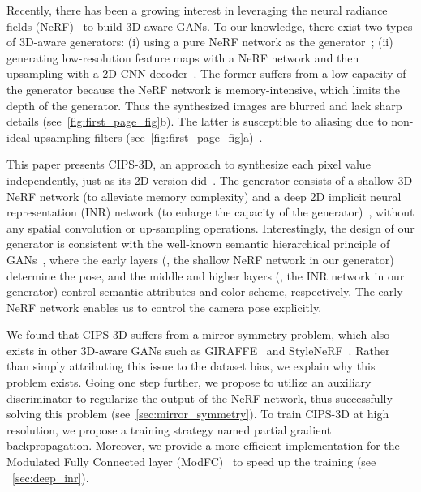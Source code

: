\documentclass[10pt,twocolumn,letterpaper]{article}
\begin{document}
Recently, there has been a growing interest in leveraging the neural radiance fields (NeRF)~\cite{mildenhall2020NeRF} to build 3D-aware GANs. To our knowledge, there exist two types of 3D-aware generators: (i) using a pure NeRF network as the generator~\cite{schwarz2020GRAF,chan2021piGAN}; (ii) generating low-resolution feature maps with a NeRF network and then upsampling with a 2D CNN decoder~\cite{niemeyer2021GIRAFFE,anonymous2021StyleNeRF}. The former suffers from a low capacity of the generator because the NeRF network is memory-intensive, which limits the depth of the generator. Thus the synthesized images are blurred and lack sharp details (see~\cref{fig:first_page_fig}b). The latter is susceptible to aliasing due to non-ideal upsampling filters (see~\cref{fig:first_page_fig}a)~\cite{karras2021AliasFree,parmar2021Buggy}.

This paper presents CIPS-3D, an approach to synthesize each pixel value independently, just as its 2D version did~\cite{anokhin2021Image}. The  generator consists of a shallow 3D NeRF network (to alleviate memory complexity) and a deep 2D implicit neural representation (INR) network (to enlarge the capacity of the generator)~\cite{park2019DeepSDF,mescheder2019Occupancy,chen2019Learninga}, without any spatial convolution or up-sampling operations. Interestingly, the design of our generator is consistent with the well-known semantic hierarchical principle of GANs~\cite{bau2018GAN,yang2020Semantic}, where the early layers (\ie, the shallow NeRF network in our generator) determine the pose, and the middle and higher layers (\ie, the INR network in our generator) control semantic attributes and color scheme, respectively. The early NeRF network enables us to control the camera pose explicitly.

We found that CIPS-3D suffers from a mirror symmetry problem, which also exists in other 3D-aware GANs such as GIRAFFE~\cite{niemeyer2021GIRAFFE} and StyleNeRF~\cite{anonymous2021StyleNeRF}. Rather than simply attributing this issue to the dataset bias, we explain why this problem exists. Going one step further, we propose to utilize an auxiliary discriminator to regularize the output of the NeRF network, thus successfully solving this problem (see~\cref{sec:mirror_symmetry}). To train CIPS-3D at high resolution, we propose a training strategy named partial gradient backpropagation. Moreover, we provide a more efficient implementation for the Modulated Fully Connected layer (ModFC)~\cite{karras2019Analyzing,anokhin2021Image} to speed up the training (see ~\cref{sec:deep_inr}).
\end{document}
